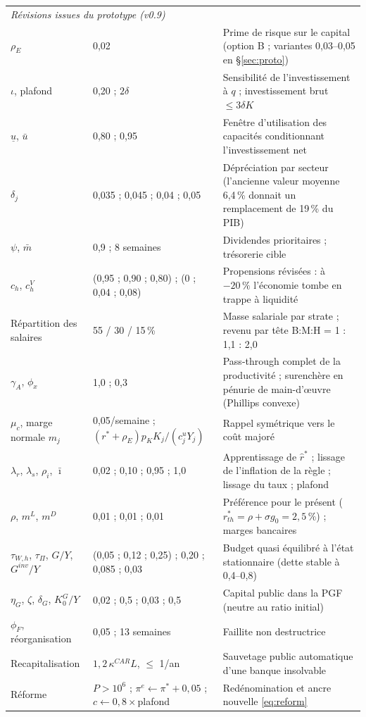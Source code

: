 \documentclass[11pt,a4paper]{article}
\begin{document}
\begin{center}
\begin{longtable}{p{4.2cm}p{3.0cm}p{7.6cm}}
\midrule
\multicolumn{3}{l}{\emph{Révisions issues du prototype (v0.9)}}\\
$\rho_E$ & 0,02 & Prime de risque sur le capital (option B ; variantes 0,03--0,05 en \S\ref{sec:proto})\\
$\iota$, plafond & 0,20 ; $2\delta$ & Sensibilité de l'investissement à $q$ ; investissement brut $\le3\delta K$\\
$\underline u$, $\bar u$ & 0,80 ; 0,95 & Fenêtre d'utilisation des capacités conditionnant l'investissement net\\
$\delta_j$ & 0,035 ; 0,045 ; 0,04 ; 0,05 & Dépréciation par secteur (l'ancienne valeur moyenne 6,4\,\% donnait un remplacement de 19\,\% du PIB)\\
$\psi$, $\bar m$ & 0,9 ; 8 semaines & Dividendes prioritaires ; trésorerie cible\\
$c_h$, $c^V_h$ & (0,95 ; 0,90 ; 0,80) ; (0 ; 0,04 ; 0,08) & Propensions révisées : à $-20\,\%$ l'économie tombe en trappe à liquidité\\
Répartition des salaires & 55 / 30 / 15\,\% & Masse salariale par strate ; revenu par tête B:M:H = 1 : 1,1 : 2,0\\
$\gamma_A$, $\phi_x$ & 1,0 ; 0,3 & Pass-through complet de la productivité ; surenchère en pénurie de main-d'œuvre (Phillips convexe)\\
$\mu_c$, marge normale $m_j$ & 0,05/semaine ; $(r^\ast+\rho_E)p_KK_j/(c^u_jY_j)$ & Rappel symétrique vers le coût majoré\\
$\lambda_r$, $\lambda_s$, $\rho_i$, $\bar\imath$ & 0,02 ; 0,10 ; 0,95 ; 1,0 & Apprentissage de $\hat r^\ast$ ; lissage de l'inflation de la règle ; lissage du taux ; plafond\\
$\rho$, $m^L$, $m^D$ & 0,01 ; 0,01 ; 0,01 & Préférence pour le présent ($r^\ast_{th}=\rho+\sigma g_0=2{,}5\,\%$) ; marges bancaires\\
$\tau_{W,h}$, $\tau_\Pi$, $G/Y$, $G^{inv}/Y$ & (0,05 ; 0,12 ; 0,25) ; 0,20 ; 0,085 ; 0,03 & Budget quasi équilibré à l'état stationnaire (dette stable à 0,4--0,8)\\
$\eta_G$, $\zeta$, $\delta_G$, $K^G_0/Y$ & 0,02 ; 0,5 ; 0,03 ; 0,5 & Capital public dans la PGF (neutre au ratio initial)\\
$\phi_F$, réorganisation & 0,05 ; 13 semaines & Faillite non destructrice\\
Recapitalisation & $1{,}2\,\kappa^{CAR}L$, $\le$ 1/an & Sauvetage public automatique d'une banque insolvable\\
Réforme & $P>10^6$ ; $\pi^e\leftarrow\pi^\ast+0{,}05$ ; $c\leftarrow0{,}8\times$plafond & Redénomination et ancre nouvelle \eqref{eq:reform}\\

\end{longtable}
\end{center}
\end{document}
